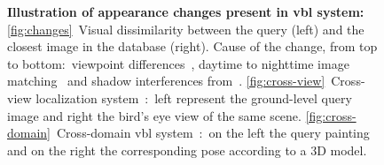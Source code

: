 \begin{figure}[t]
\begin{minipage}{0.53\linewidth}
	\end{minipage}
	\caption[Illustration of appearance changes present in \acs*{vbl} system]{\textbf{Illustration of appearance changes present in \ac{vbl} system:} \ref{fig:changes}~Visual dissimilarity between the query (left) and the closest image in the database (right). Cause of the change, from top to bottom:~viewpoint differences~\citep{Majdik2013}, daytime to nighttime image matching~\citep{Porav2018} and shadow interferences from~\citep{Corke2013}. \ref{fig:cross-view}~Cross-view localization system~\citep{Lin2015}:~left represent the ground-level query image and right the bird's eye view of the same scene. \ref{fig:cross-domain}~Cross-domain \ac{vbl} system~\citep{Aubry2014}:~on the left the query painting and on the right the corresponding pose according to a 3D model. \label{fig:data_changes}}
\end{figure}
